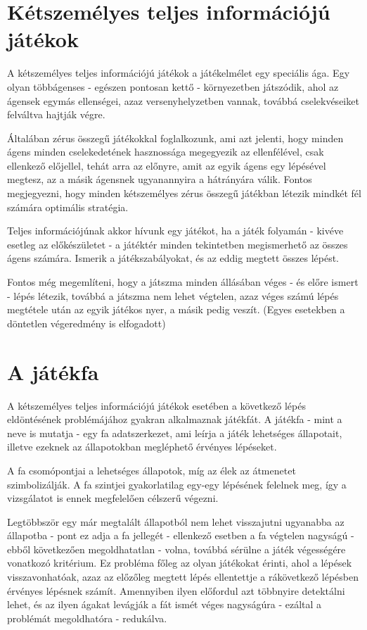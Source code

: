 \section{Kétszemélyes teljes információjú játékok}
A kétszemélyes teljes információjú játékok a játékelmélet egy speciális ága. Egy olyan többágenses - egészen pontosan kettő - környezetben játszódik, ahol az ágensek egymás ellenségei, azaz versenyhelyzetben vannak, továbbá cselekvéseiket felváltva hajtják végre.\ujsor

Általában zérus összegű játékokkal foglalkozunk, ami azt jelenti, hogy minden ágens minden cselekedetének hasznossága megegyezik az ellenfélével, csak ellenkező előjellel, tehát arra az előnyre, amit az egyik ágens egy lépésével megtesz, az a másik ágensnek ugyanannyira a hátrányára válik. Fontos megjegyezni, hogy minden kétszemélyes zérus összegű játékban létezik mindkét fél számára optimális stratégia.\ujsor

Teljes információjúnak akkor hívunk egy játékot, ha a játék folyamán - kivéve esetleg az előkészületet - a játéktér minden tekintetben megismerhető az összes ágens számára. Ismerik a játékszabályokat, és az eddig megtett összes lépést.\ujsor

Fontos még megemlíteni, hogy a játszma minden állásában véges - és előre ismert - lépés létezik, továbbá a játszma nem lehet végtelen, azaz véges számú lépés megtétele után az egyik játékos nyer, a másik pedig veszít. (Egyes esetekben a döntetlen végeredmény is elfogadott)

\section{A játékfa}
A kétszemélyes teljes információjú játékok esetében a következő lépés eldöntésének problémájához gyakran alkalmaznak játékfát. A játékfa - mint a neve is mutatja - egy fa adatszerkezet, ami leírja a játék lehetséges állapotait, illetve ezeknek az állapotokban megléphető érvényes lépéseket.\ujsor

A fa csomópontjai a lehetséges állapotok, míg az élek az átmenetet szimbolizálják. A fa szintjei gyakorlatilag egy-egy lépésének felelnek meg, így a vizsgálatot is ennek megfelelően célszerű végezni.\ujsor

Legtöbbször egy már megtalált állapotból nem lehet visszajutni ugyanabba az állapotba - pont ez adja a fa jellegét - ellenkező esetben a fa végtelen nagyságú - ebből következően megoldhatatlan - volna, továbbá sérülne a játék végességére vonatkozó kritérium. Ez probléma főleg az olyan játékokat érinti, ahol a lépések visszavonhatóak, azaz az előzőleg megtett lépés ellentettje a rákövetkező lépésben érvényes lépésnek számít. Amennyiben ilyen előfordul azt többnyire detektálni lehet, és az ilyen ágakat levágják a fát ismét véges nagyságúra - ezáltal a problémát megoldhatóra - redukálva.\ujsor

